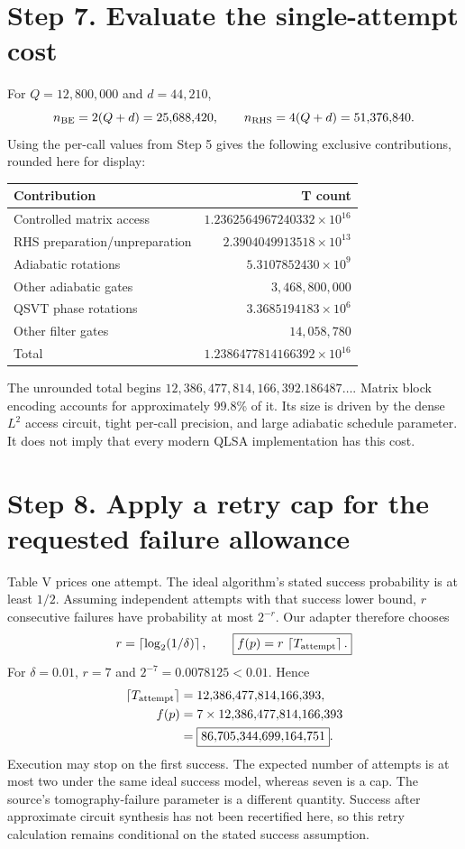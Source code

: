 \documentclass[11pt]{article}
\newcommand{\ceil}[1]{\left\lceil#1\right\rceil}
\begin{document}
\section*{Step 7. Evaluate the single-attempt cost}
For $Q=12{,}800{,}000$ and $d=44{,}210$,
\[
 n_{\rm BE}=2(Q+d)=25{,}688{,}420,\qquad
 n_{\rm RHS}=4(Q+d)=51{,}376{,}840.
\]
Using the per-call values from Step 5 gives the following exclusive contributions, rounded here for display:
\begin{center}
\begin{tabular}{lr}
\toprule
Contribution & T count\\\midrule
Controlled matrix access & $1.2362564967240332\times10^{16}$\\
RHS preparation/unpreparation & $2.3904049913518\times10^{13}$\\
Adiabatic rotations & $5.3107852430\times10^9$\\
Other adiabatic gates & $3{,}468{,}800{,}000$\\
QSVT phase rotations & $3.3685194183\times10^6$\\
Other filter gates & $14{,}058{,}780$\\\midrule
Total & $1.2386477814166392\times10^{16}$\\\bottomrule
\end{tabular}
\end{center}
The unrounded total begins $12{,}386{,}477{,}814{,}166{,}392.186487\ldots$. Matrix block encoding accounts for approximately 99.8\% of it. Its size is driven by the dense $L^2$ access circuit, tight per-call precision, and large adiabatic schedule parameter. It does not imply that every modern QLSA implementation has this cost.

\section*{Step 8. Apply a retry cap for the requested failure allowance}
Table V prices one attempt. The ideal algorithm's stated success probability is at least $1/2$. Assuming independent attempts with that success lower bound, $r$ consecutive failures have probability at most $2^{-r}$. Our adapter therefore chooses
\begin{equation}
 r=\ceil{\log_2(1/\delta)},\qquad
 \boxed{f(p)=r\,\ceil{T_{\rm attempt}}.}
\end{equation}
For $\delta=0.01$, $r=7$ and $2^{-7}=0.0078125<0.01$. Hence
\begin{align*}
 \ceil{T_{\rm attempt}}&=12{,}386{,}477{,}814{,}166{,}393,\\
 f(p)&=7\times12{,}386{,}477{,}814{,}166{,}393\\
 &=\boxed{86{,}705{,}344{,}699{,}164{,}751}.
\end{align*}
Execution may stop on the first success. The expected number of attempts is at most two under the same ideal success model, whereas seven is a cap. The source's tomography-failure parameter is a different quantity. Success after approximate circuit synthesis has not been recertified here, so this retry calculation remains conditional on the stated success assumption.
\end{document}
